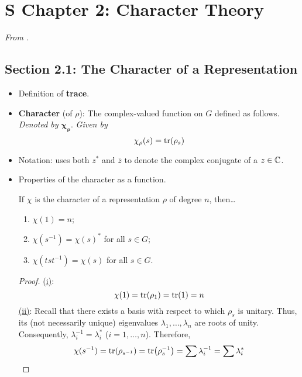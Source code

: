 \documentclass[../notes.tex]{subfiles}
\begin{document}
\section{S Chapter 2: Character Theory}
\emph{From \textcite{bib:Serre}.}
\subsection*{Section 2.1: The Character of a Representation}
\begin{itemize}
    \item {}Definition of \textbf{trace}.
    \item \textbf{Character} (of $\rho$): The complex-valued function on $G$ defined as follows. \emph{Denoted by} $\bm{\chi_\rho}$. \emph{Given by}
    \begin{equation*}
        \chi_\rho(s) = \tr(\rho_s)
    \end{equation*}
    \item Notation: \textcite{bib:Serre} uses both $z^*$ and $\bar{z}$ to denote the complex conjugate of a $z\in\mathbb{C}$.
    \item Properties of the character as a function.
    \begin{proposition}\label{prp:charPropsFun}
        If $\chi$ is the character of a representation $\rho$ of degree $n$, then\dots
        \begin{enumerate}[label={\textup{(\roman*)}}]
            \item $\chi(1)=n$;
            \item $\chi(s^{-1})=\chi(s)^*$ for all $s\in G$;
            \item $\chi(tst^{-1})=\chi(s)$ for all $s\in G$.
        \end{enumerate}
        \begin{proof}
            \underline{(i)}:
            \begin{equation*}
                \chi(1) = \tr(\rho_1)
                = \tr(1)
                = n
            \end{equation*}
            \underline{(ii)}: Recall that there exists a basis with respect to which $\rho_s$ is unitary. Thus, its (not necessarily unique) eigenvalues $\lambda_1,\dots,\lambda_n$ are roots of unity. Consequently, $\lambda_i^{-1}=\lambda_i^*$ ($i=1,\dots,n$). Therefore,
            \begin{equation*}
                \chi(s^{-1}) = \tr(\rho_{s^{-1}})
                = \tr(\rho_s^{-1})
                = \sum\lambda_i^{-1}
                = \sum\lambda_i^*

\end{equation*}
\end{proof}
\end{proposition}
\end{itemize}
\end{document}
